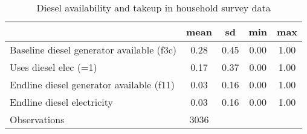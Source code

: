 \begin{table}[htbp]\centering
\def\sym#1{\ifmmode^{#1}\else\(^{#1}\)\fi}
\caption{Diesel availability and takeup in household survey data\label {tab1}}
\begin{tabular}{l*{1}{cccc}}
\toprule
                    &        mean&          sd&         min&         max\\
\midrule
Baseline diesel generator available (f3c)&        0.28&        0.45&        0.00&        1.00\\
Uses diesel elec (=1)&        0.17&        0.37&        0.00&        1.00\\
Endline diesel generator available (f11)&        0.03&        0.16&        0.00&        1.00\\
Endline diesel electricity&        0.03&        0.16&        0.00&        1.00\\
\midrule
Observations        &        3036&            &            &            \\
\bottomrule
\end{tabular}
\end{table}
